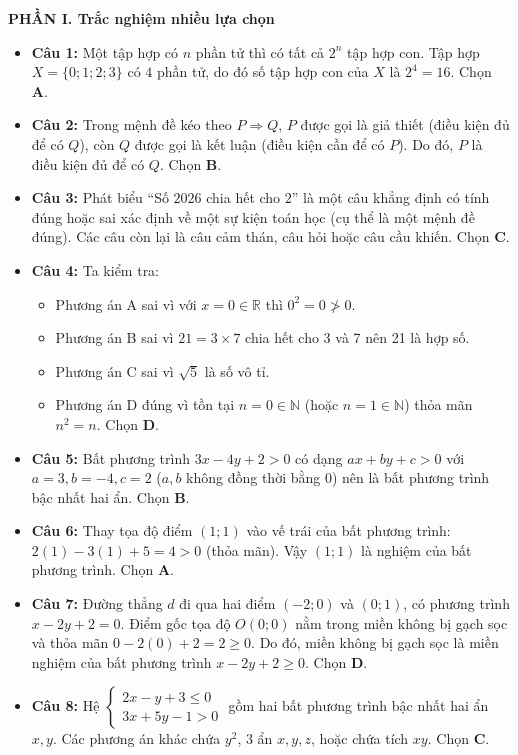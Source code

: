 \documentclass[12pt,a4paper]{article}
\begin{document}
\textbf{PHẦN I. Trắc nghiệm nhiều lựa chọn}
\begin{itemize}[leftmargin=0.6cm, itemsep=3pt]
    \item \textbf{Câu 1:} Một tập hợp có $n$ phần tử thì có tất cả $2^n$ tập hợp con. Tập hợp $X = \{0; 1; 2; 3\}$ có $4$ phần tử, do đó số tập hợp con của $X$ là $2^4 = 16$. Chọn \textbf{A}.
    \item \textbf{Câu 2:} Trong mệnh đề kéo theo $P \Rightarrow Q$, $P$ được gọi là giả thiết (điều kiện đủ để có $Q$), còn $Q$ được gọi là kết luận (điều kiện cần để có $P$). Do đó, $P$ là điều kiện đủ để có $Q$. Chọn \textbf{B}.
    \item \textbf{Câu 3:} Phát biểu ``Số $2026$ chia hết cho $2$'' là một câu khẳng định có tính đúng hoặc sai xác định về một sự kiện toán học (cụ thể là một mệnh đề đúng). Các câu còn lại là câu cảm thán, câu hỏi hoặc câu cầu khiến. Chọn \textbf{C}.
    \item \textbf{Câu 4:} Ta kiểm tra:
    \begin{itemize}
        \item Phương án A sai vì với $x = 0 \in \mathbb{R}$ thì $0^2 = 0 \ngtr 0$.
        \item Phương án B sai vì $21 = 3 \times 7$ chia hết cho 3 và 7 nên 21 là hợp số.
        \item Phương án C sai vì $\sqrt{5}$ là số vô tỉ.
        \item Phương án D đúng vì tồn tại $n = 0 \in \mathbb{N}$ (hoặc $n = 1 \in \mathbb{N}$) thỏa mãn $n^2 = n$. Chọn \textbf{D}.
    \end{itemize}
    \item \textbf{Câu 5:} Bất phương trình $3x - 4y + 2 > 0$ có dạng $ax + by + c > 0$ với $a = 3, b = -4, c = 2$ ($a, b$ không đồng thời bằng 0) nên là bất phương trình bậc nhất hai ẩn. Chọn \textbf{B}.
    \item \textbf{Câu 6:} Thay tọa độ điểm $(1; 1)$ vào vế trái của bất phương trình:
    $2(1) - 3(1) + 5 = 4 > 0$ (thỏa mãn). Vậy $(1; 1)$ là nghiệm của bất phương trình. Chọn \textbf{A}.
    \item \textbf{Câu 7:} Đường thẳng $d$ đi qua hai điểm $(-2; 0)$ và $(0; 1)$, có phương trình $x - 2y + 2 = 0$. Điểm gốc tọa độ $O(0; 0)$ nằm trong miền không bị gạch sọc và thỏa mãn $0 - 2(0) + 2 = 2 \ge 0$. Do đó, miền không bị gạch sọc là miền nghiệm của bất phương trình $x - 2y + 2 \ge 0$. Chọn \textbf{D}.
    \item \textbf{Câu 8:} Hệ $\begin{cases} 2x - y + 3 \le 0 \\ 3x + 5y - 1 > 0 \end{cases}$ gồm hai bất phương trình bậc nhất hai ẩn $x, y$. Các phương án khác chứa $y^2$, 3 ẩn $x, y, z$, hoặc chứa tích $xy$. Chọn \textbf{C}.

\end{itemize}
\end{document}
